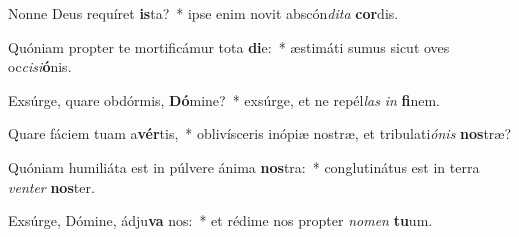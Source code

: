\item Nonne Deus requíret \textbf{is}ta?~* ipse enim novit abscón\textit{di}\textit{ta} \textbf{cor}dis.
\item Quóniam propter te mortificámur tota \textbf{di}e:~* æstimáti sumus sicut oves oc\textit{ci}\textit{si}\textbf{ó}nis.
\item Exsúrge, quare obdórmis, \textbf{Dó}mine?~* exsúrge, et ne repél\textit{las} \textit{in} \textbf{fi}nem.
\item Quare fáciem tuam a\textbf{vér}tis,~* oblivísceris inópiæ nostræ, et tribulati\textit{ó}\textit{nis} \textbf{nos}træ?
\item Quóniam humiliáta est in púlvere ánima \textbf{nos}tra:~* conglutinátus est in terra \textit{ven}\textit{ter} \textbf{nos}ter.
\item Exsúrge, Dómine, ádju\textbf{va} nos:~* et rédime nos propter \textit{no}\textit{men} \textbf{tu}um.
